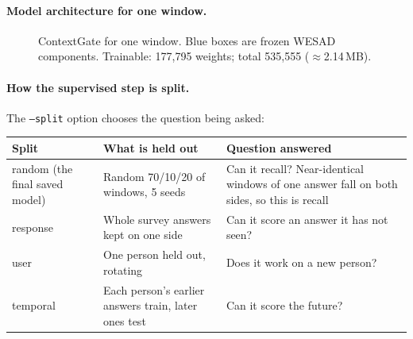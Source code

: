 \documentclass[11pt,a4paper]{article}
\begin{document}
\paragraph{Model architecture for one window.}
\begin{figure}[H]
\centering
{}
\caption{ContextGate for one window. Blue boxes are frozen WESAD components. Trainable: 177,795
weights; total 535,555 ($\approx$2.14\,MB).}
\end{figure}

\paragraph{How the supervised step is split.} The \texttt{--split} option chooses the question being asked:

\begin{table}[H]
\centering\small
\begin{tabularx}{\textwidth}{@{}>{\raggedright\arraybackslash}p{4.2cm}YY@{}}
\toprule
\textbf{Split} & \textbf{What is held out} & \textbf{Question answered}\\
\midrule
random (the final saved model) & Random 70/10/20 of windows, 5 seeds & Can it recall? Near-identical windows of one answer fall on both sides, so this is recall\\
response & Whole survey answers kept on one side & Can it score an answer it has not seen?\\
user & One person held out, rotating & Does it work on a new person?\\
temporal & Each person's earlier answers train, later ones test & Can it score the future?\\
\bottomrule
\end{tabularx}
\end{table}
\end{document}
